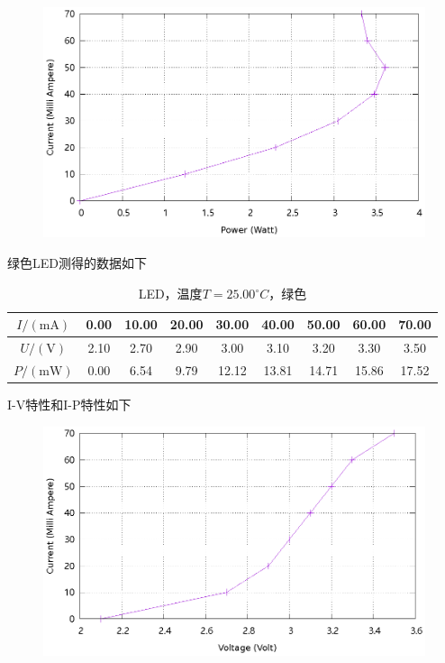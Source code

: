 \documentclass{ctexart}
\newcommand{\si}[1]{\mathrm{#1}}
\begin{document}
\begin{figure}[H]
  \centering
  \includegraphics[width=0.8\linewidth]{optics-figures/led-pc-3.gnuplot}
\end{figure}

\newpage
绿色LED测得的数据如下

\begin{table}[H]
  \centering
  \begin{tabular}{|c|c|c|c|c|c|c|c|c|}
    \hline
    $I/(\si{mA})$   & 0.00 & 10.00 & 20.00 & 30.00 & 40.00 & 50.00 & 60.00 & 70.00 \\\hline
    $U / (\si{V})$  & 2.10 & 2.70 & 2.90 & 3.00 & 3.10 & 3.20 & 3.30 & 3.50 \\\hline
    $P / (\si{mW})$ & 0.00 & 6.54 & 9.79 & 12.12 & 13.81 & 14.71 & 15.86 & 17.52 \\\hline
  \end{tabular}
  \caption{LED，温度$T=25.00{}^{\circ}C$，绿色}
\end{table}

I-V特性和I-P特性如下

\begin{figure}[H]
  \centering
  \includegraphics[width=0.8\linewidth]{optics-figures/led-vc-4.gnuplot}
\end{figure}
\end{document}
